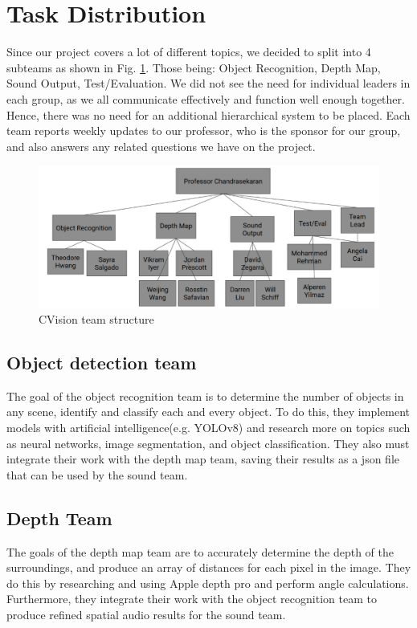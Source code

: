 \documentclass[12pt,a4paper]{article}
\begin{document}
\newpage
\section{Task Distribution}
Since our project covers a lot of different topics, we decided to split into 4 subteams as shown in Fig. \ref{team}. Those being: Object Recognition, Depth Map, Sound Output, Test/Evaluation. We did not see the need for individual leaders in each group, as we all communicate effectively and function well enough together. Hence, there was no need for an additional hierarchical system to be placed. Each team reports weekly updates to our professor, who is the sponsor for our group, and also answers any related questions we have on the project.
\begin{figure}[ht!]
    \center
    \includegraphics[width=1\linewidth]{team.png}
    \caption{CVision team structure}
    \label{team}
  \end{figure}

\subsection{Object detection team}
The goal of the object recognition team is to determine the number of objects in any scene, identify and classify each and every object. To do this, they implement models with artificial intelligence(e.g. YOLOv8) and research more on topics such as neural networks, image segmentation, and object classification. They also must integrate their work with the depth map team, saving their results as a json file that can be used by the sound team. 

\subsection{Depth Team}
The goals of the depth map team are to accurately determine the depth of the surroundings, and produce an array of distances for each pixel in the image. They do this by researching and using Apple depth pro and perform angle calculations. Furthermore, they integrate their work with the object recognition team to produce refined spatial audio results for the sound team. 
\end{document}
